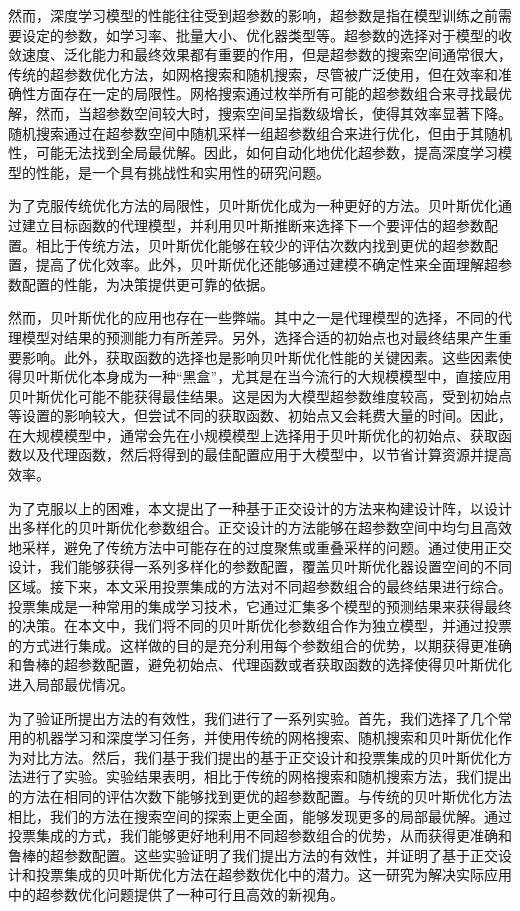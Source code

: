 \documentclass{SCIA2018cn}
\theoremstyle{mystyle}
\begin{document}
然而，深度学习模型的性能往往受到超参数的影响，超参数是指在模型训练之前需要设定的参数，如学习率、批量大小、优化器类型等。超参数的选择对于模型的收敛速度、泛化能力和最终效果都有重要的作用，但是超参数的搜索空间通常很大，传统的超参数优化方法，如网格搜索和随机搜索，尽管被广泛使用，但在效率和准确性方面存在一定的局限性。网格搜索通过枚举所有可能的超参数组合来寻找最优解，然而，当超参数空间较大时，搜索空间呈指数级增长，使得其效率显著下降。随机搜索通过在超参数空间中随机采样一组超参数组合来进行优化，但由于其随机性，可能无法找到全局最优解。因此，如何自动化地优化超参数，提高深度学习模型的性能，是一个具有挑战性和实用性的研究问题。

为了克服传统优化方法的局限性，贝叶斯优化成为一种更好的方法。贝叶斯优化通过建立目标函数的代理模型，并利用贝叶斯推断来选择下一个要评估的超参数配置。相比于传统方法，贝叶斯优化能够在较少的评估次数内找到更优的超参数配置，提高了优化效率。此外，贝叶斯优化还能够通过建模不确定性来全面理解超参数配置的性能，为决策提供更可靠的依据。

然而，贝叶斯优化的应用也存在一些弊端。其中之一是代理模型的选择，不同的代理模型对结果的预测能力有所差异。另外，选择合适的初始点也对最终结果产生重要影响。此外，获取函数的选择也是影响贝叶斯优化性能的关键因素。这些因素使得贝叶斯优化本身成为一种“黑盒”，尤其是在当今流行的大规模模型中，直接应用贝叶斯优化可能不能获得最佳结果。这是因为大模型超参数维度较高，受到初始点等设置的影响较大，但尝试不同的获取函数、初始点又会耗费大量的时间。因此，在大规模模型中，通常会先在小规模模型上选择用于贝叶斯优化的初始点、获取函数以及代理函数，然后将得到的最佳配置应用于大模型中，以节省计算资源并提高效率。

为了克服以上的困难，本文提出了一种基于正交设计的方法来构建设计阵，以设计出多样化的贝叶斯优化参数组合。正交设计的方法能够在超参数空间中均匀且高效地采样，避免了传统方法中可能存在的过度聚焦或重叠采样的问题。通过使用正交设计，我们能够获得一系列多样化的参数配置，覆盖贝叶斯优化器设置空间的不同区域。接下来，本文采用投票集成的方法对不同超参数组合的最终结果进行综合。投票集成是一种常用的集成学习技术，它通过汇集多个模型的预测结果来获得最终的决策。在本文中，我们将不同的贝叶斯优化参数组合作为独立模型，并通过投票的方式进行集成。这样做的目的是充分利用每个参数组合的优势，以期获得更准确和鲁棒的超参数配置，避免初始点、代理函数或者获取函数的选择使得贝叶斯优化进入局部最优情况。

为了验证所提出方法的有效性，我们进行了一系列实验。首先，我们选择了几个常用的机器学习和深度学习任务，并使用传统的网格搜索、随机搜索和贝叶斯优化作为对比方法。然后，我们基于我们提出的基于正交设计和投票集成的贝叶斯优化方法进行了实验。实验结果表明，相比于传统的网格搜索和随机搜索方法，我们提出的方法在相同的评估次数下能够找到更优的超参数配置。与传统的贝叶斯优化方法相比，我们的方法在搜索空间的探索上更全面，能够发现更多的局部最优解。通过投票集成的方式，我们能够更好地利用不同超参数组合的优势，从而获得更准确和鲁棒的超参数配置。这些实验证明了我们提出方法的有效性，并证明了基于正交设计和投票集成的贝叶斯优化方法在超参数优化中的潜力。这一研究为解决实际应用中的超参数优化问题提供了一种可行且高效的新视角。
\end{document}
